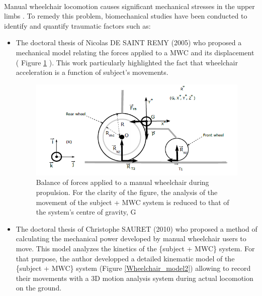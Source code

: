 \paragraph{}Manual wheelchair locomotion causes significant mechanical stresses in the upper limbs \cite{desroches2010expression}. To remedy this problem, biomechanical studies have been conducted to identify and quantify traumatic factors such as:
\begin{itemize}
\item The doctoral thesis of Nicolas DE SAINT REMY (2005) \cite{Remy2005} who proposed a
mechanical model relating the forces applied to a MWC and its displacement ( Figure \ref{Wheelchair_model} ). This work particularly highlighted the fact that wheelchair acceleration is a function of subject's movements.

\begin{figure}[h]
\center
\includegraphics[scale = 0.6]{images/wheelchair_model2}
\caption{Balance of forces applied to a manual wheelchair during propulsion. For the clarity of the figure, the analysis of the movement of the {subject + MWC} system is reduced to that of the system's centre of gravity, G \cite{Remy2005}}
\label{Wheelchair_model}
\end{figure}

\item The doctoral thesis of Christophe SAURET (2010) \cite{Sauret2010} who proposed a method of calculating the mechanical power developed by manual wheelchair users to move. This model analyzes the kinetics of the \{subject + MWC\} system. For that purpose, the author developped a detailed kinematic model of the \{subject + MWC\} system (Figure \ref{Wheelchair_model2}) allowing to record their movements with a 3D motion analysis system during actual locomotion on the ground. 



\end{itemize}
